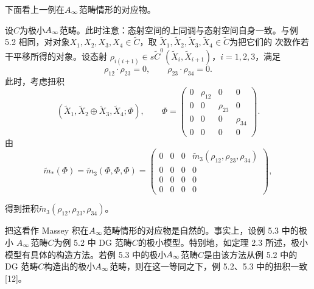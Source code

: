
下面看上一例在$A_{\infty}$范畴情形的对应物。

\begin{example}
\label{ex:c04-5.3}
设$C$为极小$A_{\infty}$范畴。此时注意：态射空间的上同调与态射空间自身一致。与例 5.2
相同，对对象$X_{1},X_{2},X_{3},X_{4}\in\tilde{C}$，取
$\tilde{X}_{1},\tilde{X}_{2},\tilde{X}_{3},\tilde{X}_{4}\in\tilde{C}$为把它们的
次数作若干平移所得的对象。设态射
$\rho_{i(i+1)}\in s\tilde{C}^{0}(\tilde{X}_{i},\tilde{X}_{i+1})$，$i=1,2,3$，满足
\[
\rho_{12}\cdot\rho_{23}=0,\qquad \rho_{23}\cdot\rho_{34}=0.
\]
此时，考虑扭积
\[
(\tilde{X}_{1},\tilde{X}_{2}\oplus\tilde{X}_{3},\tilde{X}_{4};\Phi),
\qquad
\Phi=
\begin{pmatrix}
0 & \rho_{12} & 0 & 0\\
0 & 0 & \rho_{23} & 0\\
0 & 0 & 0 & \rho_{34}\\
0 & 0 & 0 & 0
\end{pmatrix}.
\]
由
\[
\tilde{m}_{*}(\Phi)=\tilde{m}_{3}(\Phi,\Phi,\Phi)=
\begin{pmatrix}
0&0&0&\tilde{m}_{3}(\rho_{12},\rho_{23},\rho_{34})\\
0&0&0&0\\
0&0&0&0\\
0&0&0&0
\end{pmatrix},
\]

得到扭积$\tilde{m}_{3}(\rho_{12},\rho_{23},\rho_{34})$。
\end{example}


把这看作 Massey 积在$A_{\infty}$范畴情形的对应物是自然的。事实上，设例 5.3 中的极小
$A_{\infty}$范畴$C$为例 5.2 中 DG 范畴$C$的极小模型。特别地，如定理 2.3 所述，极小
模型有具体的构造方法。若例 5.3 中的极小$A_{\infty}$范畴$C$是由该方法从例 5.2 中的 DG
范畴$C$构造出的极小$A_{\infty}$范畴，则在这一等同之下，例 5.2、5.3 中的扭积一致
[12]。


